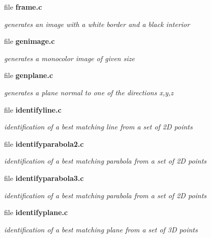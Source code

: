 \begin{CompactItemize}
\item 
file {\bf frame.c}
\begin{CompactList}\small\item\em generates an image with a white border and a black interior \item\end{CompactList}

\item 
file {\bf genimage.c}
\begin{CompactList}\small\item\em generates a monocolor image of given size \item\end{CompactList}

\item 
file {\bf genplane.c}
\begin{CompactList}\small\item\em generates a plane normal to one of the directions x,y,z \item\end{CompactList}

\item 
file {\bf identifyline.c}
\begin{CompactList}\small\item\em identification of a best matching line from a set of 2D points \item\end{CompactList}

\item 
file {\bf identifyparabola2.c}
\begin{CompactList}\small\item\em identification of a best matching parabola from a set of 2D points \item\end{CompactList}

\item 
file {\bf identifyparabola3.c}
\begin{CompactList}\small\item\em identification of a best matching parabola from a set of 2D points \item\end{CompactList}

\item 
file {\bf identifyplane.c}
\begin{CompactList}\small\item\em identification of a best matching plane from a set of 3D points \item\end{CompactList}


\end{CompactItemize}
